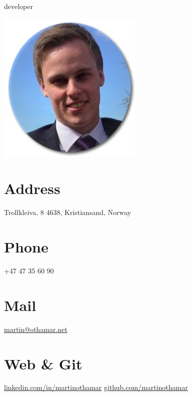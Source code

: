 \documentclass[]{cv-class}
\begin{document}
      {developer}

\vspace{1.15cm}

\begin{aside}
  \includegraphics[scale=0.40]{img/meg2.jpg}
  	~
  \section{Address}
    Trollkleiva, 8
    4638, Kristiansand, Norway
    ~
  \section{Phone}
    +47 47 35 60 90
    ~
  \section{Mail}
    \underline{\href{mailto:martin@othamar.net}{martin@othamar.net}}
    ~
  \section{Web \& Git}
    \underline{\href{https://no.linkedin.com/in/martinothamar}{linkedin.com/in/martinothamar}}
    \underline{\href{https://github.com/martinothamar}{github.com/martinothamar}}
    ~

\end{aside}
\end{document}
